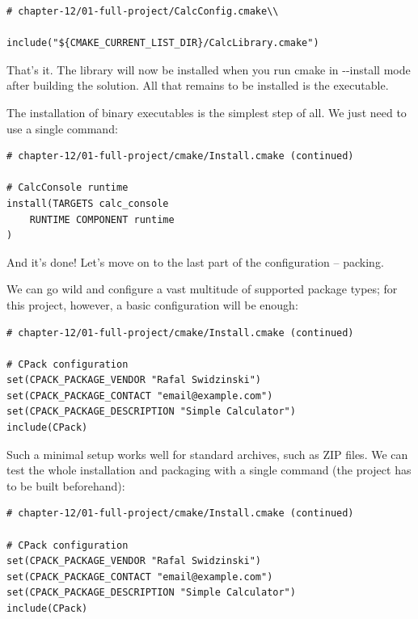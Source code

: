 \begin{lstlisting}[style=styleCMake]
# chapter-12/01-full-project/CalcConfig.cmake\\

include("${CMAKE_CURRENT_LIST_DIR}/CalcLibrary.cmake")
\end{lstlisting}

That's it. The library will now be installed when you run cmake in -{}-install mode after building the solution. All that remains to be installed is the executable.


The installation of binary executables is the simplest step of all. We just need to use a single command:

\begin{lstlisting}[style=styleCMake]
# chapter-12/01-full-project/cmake/Install.cmake (continued)

# CalcConsole runtime
install(TARGETS calc_console
	RUNTIME COMPONENT runtime
)
\end{lstlisting}

And it's done! Let's move on to the last part of the configuration – packing.


We can go wild and configure a vast multitude of supported package types; for this project, however, a basic configuration will be enough:

\begin{lstlisting}[style=styleCMake]
# chapter-12/01-full-project/cmake/Install.cmake (continued)

# CPack configuration
set(CPACK_PACKAGE_VENDOR "Rafal Swidzinski")
set(CPACK_PACKAGE_CONTACT "email@example.com")
set(CPACK_PACKAGE_DESCRIPTION "Simple Calculator")
include(CPack)
\end{lstlisting}

Such a minimal setup works well for standard archives, such as ZIP files. We can test the whole installation and packaging with a single command (the project has to be built beforehand):


\begin{lstlisting}[style=styleCMake]
# chapter-12/01-full-project/cmake/Install.cmake (continued)

# CPack configuration
set(CPACK_PACKAGE_VENDOR "Rafal Swidzinski")
set(CPACK_PACKAGE_CONTACT "email@example.com")
set(CPACK_PACKAGE_DESCRIPTION "Simple Calculator")
include(CPack)
\end{lstlisting}

